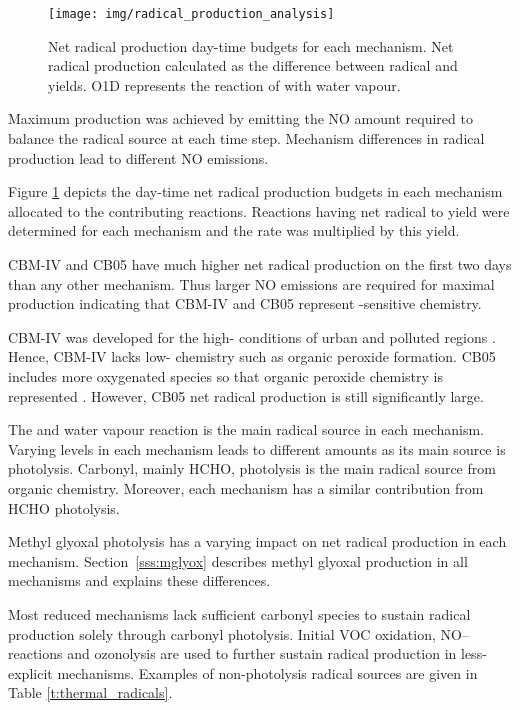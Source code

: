 \begin{figure}
    \centering
    \texttt{[image: img/radical\_production\_analysis]}
    \vspace{0mm}
    \caption{Net radical production day-time budgets for each mechanism. Net radical production calculated as the difference between radical and  yields. O1D represents the reaction of  with water vapour.}
    \vspace{-4mm}
    \label{f:radical_production} 
\end{figure} 

Maximum  production was achieved by emitting the NO amount required to balance the radical source at each time step. 
Mechanism differences in radical production lead to different NO emissions.

Figure \ref{f:radical_production} depicts the day-time net radical production budgets in each mechanism allocated to the contributing reactions.
Reactions having net radical to  yield were determined for each mechanism and the rate was multiplied by this yield.

CBM-IV and CB05 have much higher net radical production on the first two days than any other mechanism.
Thus larger NO emissions are required for maximal  production indicating that CBM-IV and CB05 represent -sensitive chemistry.

CBM-IV was developed for the high- conditions of urban and polluted regions \citep{Gery:1989}.
Hence, CBM-IV lacks low- chemistry such as organic peroxide formation.
CB05 includes more oxygenated species so that organic peroxide chemistry is represented \citep{Yarwood:2005}.
However, CB05 net radical production is still significantly large.

The  and water vapour reaction is the main radical source in each mechanism.
Varying  levels in each mechanism leads to different  amounts as its main source is  photolysis.
Carbonyl, mainly HCHO, photolysis is the main radical source from organic chemistry.
Moreover, each mechanism has a similar contribution from HCHO photolysis.

Methyl glyoxal photolysis has a varying impact on net radical production in each mechanism.
\mbox{Section \ref{sss:mglyox}} describes methyl glyoxal production in all mechanisms and explains these differences.

Most reduced mechanisms lack sufficient carbonyl species to sustain radical production solely through carbonyl photolysis.
Initial VOC oxidation, NO-- reactions and ozonolysis are used to further sustain radical production in less-explicit mechanisms.
Examples of non-photolysis radical sources are given in Table \ref{t:thermal_radicals}.

